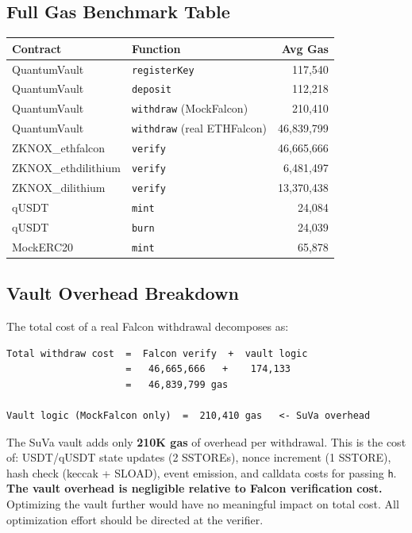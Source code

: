 \documentclass[11pt,a4paper]{article}
\begin{document}
\subsection{Full Gas Benchmark Table}

\begin{center}
\begin{tabular}{llr}
\toprule
\textbf{Contract} & \textbf{Function} & \textbf{Avg Gas} \\
\midrule
QuantumVault & \texttt{registerKey} & 117,540 \\
QuantumVault & \texttt{deposit} & 112,218 \\
QuantumVault & \texttt{withdraw} (MockFalcon) & 210,410 \\
QuantumVault & \texttt{withdraw} (real ETHFalcon) & 46,839,799 \\
\midrule
ZKNOX\_ethfalcon & \texttt{verify} & 46,665,666 \\
ZKNOX\_ethdilithium & \texttt{verify} & 6,481,497 \\
ZKNOX\_dilithium & \texttt{verify} & 13,370,438 \\
\midrule
qUSDT & \texttt{mint} & 24,084 \\
qUSDT & \texttt{burn} & 24,039 \\
MockERC20 & \texttt{mint} & 65,878 \\
\bottomrule
\end{tabular}
\end{center}

\subsection{Vault Overhead Breakdown}

The total cost of a real Falcon withdrawal decomposes as:

\begin{lstlisting}[style=bash, caption={Vault overhead decomposition}]
Total withdraw cost  =  Falcon verify  +  vault logic
                     =   46,665,666   +    174,133
                     =   46,839,799 gas

Vault logic (MockFalcon only)  =  210,410 gas   <- SuVa overhead
\end{lstlisting}

\begin{infobox}[Interpretation]
The SuVa vault adds only \textbf{210K gas} of overhead per withdrawal. This is the cost of:
USDT/qUSDT state updates (2 SSTOREs), nonce increment (1 SSTORE), hash check (keccak + SLOAD), event emission, and calldata costs for passing \texttt{h}.\\[4pt]
\textbf{The vault overhead is negligible relative to Falcon verification cost.} Optimizing the vault further would have no meaningful impact on total cost. All optimization effort should be directed at the verifier.
\end{infobox}
\end{document}
